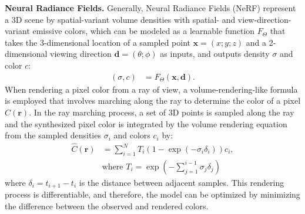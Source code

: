 \documentclass[letterpaper, 10 pt, conference]{ieeeconf}  %
\begin{document}
\noindent
{\bf Neural Radiance Fields.}
Generally, Neural Radiance Fields (NeRF) represent a 3D scene by spatial-variant volume densities with spatial- and view-direction-variant emissive colors, which can be modeled as a learnable function $F_\Theta$ that 
takes the 3-dimensional location of a sampled point $\mathbf{x} = (x; y; z)$ and a 2-dimensional viewing direction $\mathbf{d}=(\theta;\phi)$ as inputs, and outputs density $\sigma$ and color $c$:
\begin{align}
    (\sigma, c) & = F_\Theta(\mathbf{x}, \mathbf{d}).
\end{align}
When rendering a pixel color from a ray of view, a volume-rendering-like formula is employed that involves marching along the ray to determine the color of a pixel $\hat{C}(\mathbf{r})$. 
In the ray marching process, a set of 3D points is sampled along the ray and the synthesized pixel color is integrated by the volume rendering equation from the sampled densities $\sigma_i$ and colors $c_i$ by:
\begin{align} 
\hat{C}(\boldsymbol{r}) &=\sum_{i=1}^N T_i (1-\exp (-\sigma_i \delta_i)) c_i, \nonumber\\
                       &\mbox{where } T_i = \exp \left(-\sum_{j=1}^{i-1}\sigma_j\delta_j\right)
\end{align}
where $\delta_i=t_{i+1}-t_i$ is the distance between adjacent samples.
This rendering process is differentiable, and therefore, the model can be optimized by minimizing the difference between the observed and rendered colors.
\end{document}
